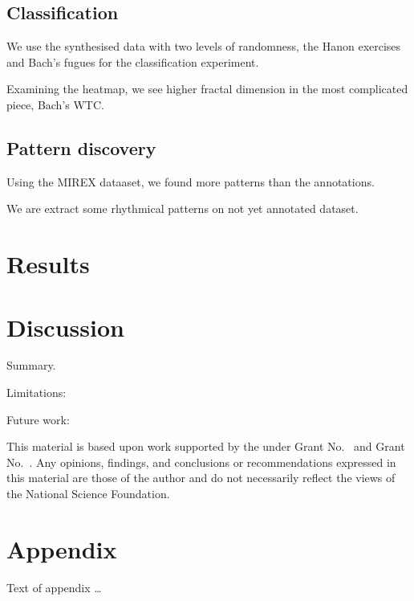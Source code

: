 \documentclass[acmsmall,review,anonymous]{acmart}\settopmatter{printfolios=true,printccs=false,printacmref=false}
\begin{document}
\subsection{Classification}
We use the synthesised data with two levels of randomness, the Hanon exercises
and Bach's fugues for the classification experiment.

Examining the heatmap, we see higher fractal dimension in the most complicated
piece, Bach's WTC. 

\subsection{Pattern discovery}
Using the MIREX dataaset, we found more patterns than the annotations.

We are extract some rhythmical patterns on not yet annotated dataset.

\section{Results}

\section{Discussion}

Summary. 

Limitations: 

Future work:


\begin{acks}                            %
  This material is based upon work supported by the
   under Grant
  No.~ and Grant
  No.~.  Any opinions, findings, and
  conclusions or recommendations expressed in this material are those
  of the author and do not necessarily reflect the views of the
  National Science Foundation.
\end{acks}





\appendix
\section{Appendix}

Text of appendix \ldots
\end{document}
